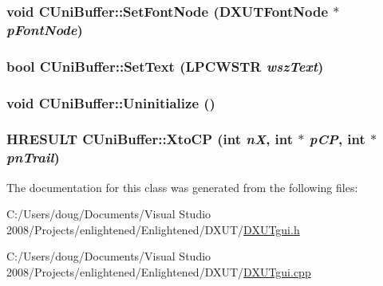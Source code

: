 \label{class_c_uni_buffer_ac1584ce27e2969eb9a33159a15d0b1e6}
\hypertarget{class_c_uni_buffer_abfc7664ed4c8da9b254dc75137da17b3}{
\subsubsection[{SetFontNode}]{\setlength{\rightskip}{0pt plus 5cm}void CUniBuffer::SetFontNode ({\bf DXUTFontNode} $\ast$ {\em pFontNode})}}
\label{class_c_uni_buffer_abfc7664ed4c8da9b254dc75137da17b3}
\hypertarget{class_c_uni_buffer_a1d0bcdd0278d7d49bfc4dd00898730b2}{
\subsubsection[{SetText}]{\setlength{\rightskip}{0pt plus 5cm}bool CUniBuffer::SetText (LPCWSTR {\em wszText})}}
\label{class_c_uni_buffer_a1d0bcdd0278d7d49bfc4dd00898730b2}
\hypertarget{class_c_uni_buffer_a6c35e6bd8c80ef44836b228bd07a17c4}{
\subsubsection[{Uninitialize}]{\setlength{\rightskip}{0pt plus 5cm}void CUniBuffer::Uninitialize ()}}
\label{class_c_uni_buffer_a6c35e6bd8c80ef44836b228bd07a17c4}
\hypertarget{class_c_uni_buffer_adea62d3f30ad870b207d8816b0a1ce89}{
\subsubsection[{XtoCP}]{\setlength{\rightskip}{0pt plus 5cm}HRESULT CUniBuffer::XtoCP (int {\em nX}, \/  int $\ast$ {\em pCP}, \/  int $\ast$ {\em pnTrail})}}
\label{class_c_uni_buffer_adea62d3f30ad870b207d8816b0a1ce89}


The documentation for this class was generated from the following files:\begin{DoxyCompactItemize}
\item 
C:/Users/doug/Documents/Visual Studio 2008/Projects/enlightened/Enlightened/DXUT/\hyperlink{_d_x_u_tgui_8h}{DXUTgui.h}\item 
C:/Users/doug/Documents/Visual Studio 2008/Projects/enlightened/Enlightened/DXUT/\hyperlink{_d_x_u_tgui_8cpp}{DXUTgui.cpp}\end{DoxyCompactItemize}
